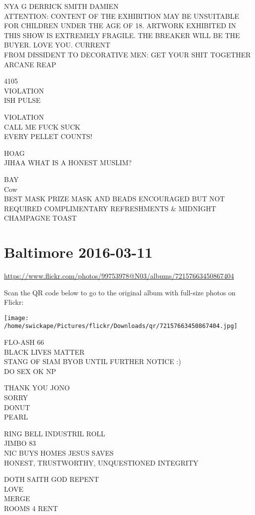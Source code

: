\documentclass[10pt,letterpaper]{article}
\begin{document}
NYA G DERRICK SMITH DAMIEN\\
ATTENTION: CONTENT OF THE EXHIBITION MAY BE UNSUITABLE FOR CHILDREN UNDER THE AGE OF 18.  ARTWORK EXHIBITED IN THIS SHOW IS EXTREMELY FRAGILE.  THE BREAKER WILL BE THE BUYER.  LOVE YOU.  CURRENT\\
FROM DISSIDENT TO DECORATIVE MEN: GET YOUR SHIT TOGETHER\\
ARCANE REAP

4105\\
VIOLATION\\
ISH PULSE

VIOLATION\\
CALL ME FUCK SUCK\\
EVERY PELLET COUNTS!

HOAG\\
JIHAA WHAT IS A HONEST MUSLIM?

BAY\\
Cow\\
BEST MASK PRIZE MASK AND BEADS ENCOURAGED BUT NOT REQUIRED COMPLIMENTARY REFRESHMENTS \& MIDNIGHT CHAMPAGNE TOAST
\pagebreak

\section*{Baltimore 2016-03-11}

\url{https://www.flickr.com/photos/99753978@N03/albums/72157663450867404}

Scan the QR code below to go to the original album with full-size photos on Flickr:

\texttt{[image: /home/swickape/Pictures/flickr/Downloads/qr/72157663450867404.jpg]}
\pagebreak

FLO{-}ASH 66\\
BLACK LIVES MATTER\\
STANG OF SIAM BYOB UNTIL FURTHER NOTICE :)\\
DO SEX OK NP

THANK YOU JONO\\
SORRY\\
DONUT\\
PEARL

RING BELL INDUSTRIL ROLL\\
JIMBO 83\\
NIC BUYS HOMES JESUS SAVES\\
HONEST, TRUSTWORTHY, UNQUESTIONED INTEGRITY

DOTH SAITH GOD REPENT\\
LOVE\\
MERGE\\
ROOMS 4 RENT
\end{document}
